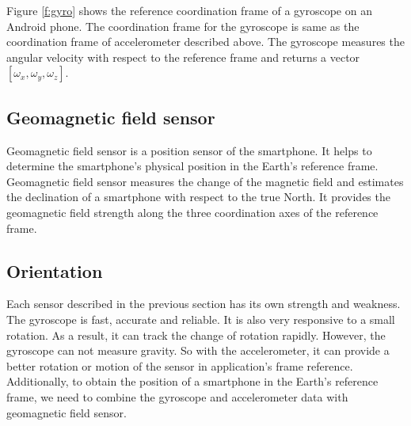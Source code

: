 Figure \ref{f:gyro} shows the reference coordination frame of a gyroscope on an Android phone.
The coordination frame for the gyroscope is same as the coordination frame of accelerometer described above.
The gyroscope measures the angular velocity with respect to the reference frame and returns a vector $[\omega_x, \omega_y, \omega_z]$.


\subsection{Geomagnetic field sensor}
Geomagnetic field sensor is a position sensor of the smartphone.
It helps to determine the smartphone's physical position in the Earth's reference frame.
Geomagnetic field sensor measures the change of the magnetic field and estimates the declination of a smartphone with respect to the true North. 
It provides the geomagnetic field strength along the three coordination axes of the reference frame.

\subsection{Orientation}
Each sensor described in the previous section has its own strength and weakness.
The gyroscope is fast, accurate and reliable.
It is also very responsive to a small rotation.
As a result, it can track the change of rotation rapidly.
However, the gyroscope can not measure gravity. 
So with the accelerometer, it can provide a better rotation or motion of the sensor in application's frame reference. 
Additionally, to obtain the position of a smartphone in the Earth's reference frame, we need to combine the gyroscope and accelerometer data with geomagnetic field sensor.

